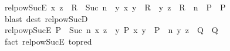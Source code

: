 \begin{isabellebody}
\endisatagproof
{\isafoldproof}%
%
\isadelimproof
\isanewline
%
\endisadelimproof
\isanewline
{}\isamarkupfalse%
\ relpow{\isacharunderscore}{\kern0pt}Suc{\isacharunderscore}{\kern0pt}E{}{\isacharcolon}{\kern0pt}\ {\isachardoublequoteopen}{\isacharparenleft}{\kern0pt}x{\isacharcomma}{\kern0pt}\ z{\isacharparenright}{\kern0pt}\ {\isasymin}\ R\ {\isacharcircum}{\kern0pt}{\isacharcircum}{\kern0pt}\ Suc\ n\ {\isasymLongrightarrow}\ {\isacharparenleft}{\kern0pt}{\isasymAnd}y{\isachardot}{\kern0pt}\ {\isacharparenleft}{\kern0pt}x{\isacharcomma}{\kern0pt}\ y{\isacharparenright}{\kern0pt}\ {\isasymin}\ R\ {\isasymLongrightarrow}\ {\isacharparenleft}{\kern0pt}y{\isacharcomma}{\kern0pt}\ z{\isacharparenright}{\kern0pt}\ {\isasymin}\ R\ {\isacharcircum}{\kern0pt}{\isacharcircum}{\kern0pt}\ n\ {\isasymLongrightarrow}\ P{\isacharparenright}{\kern0pt}\ {\isasymLongrightarrow}\ P{\isachardoublequoteclose}\isanewline
%
\isadelimproof
\ \ %
\endisadelimproof
%
\isatagproof
{}\isamarkupfalse%
\ {\isacharparenleft}{\kern0pt}blast\ dest{\isacharcolon}{\kern0pt}\ relpow{\isacharunderscore}{\kern0pt}Suc{\isacharunderscore}{\kern0pt}D{}{\isacharparenright}{\kern0pt}%
\endisatagproof
{\isafoldproof}%
%
\isadelimproof
\isanewline
%
\endisadelimproof
\isanewline
{}\isamarkupfalse%
\ relpowp{\isacharunderscore}{\kern0pt}Suc{\isacharunderscore}{\kern0pt}E{}{\isacharcolon}{\kern0pt}\ {\isachardoublequoteopen}{\isacharparenleft}{\kern0pt}P\ {\isacharcircum}{\kern0pt}{\isacharcircum}{\kern0pt}\ Suc\ n{\isacharparenright}{\kern0pt}\ x\ z\ {\isasymLongrightarrow}\ {\isacharparenleft}{\kern0pt}{\isasymAnd}y{\isachardot}{\kern0pt}\ P\ x\ y\ {\isasymLongrightarrow}\ {\isacharparenleft}{\kern0pt}P\ {\isacharcircum}{\kern0pt}{\isacharcircum}{\kern0pt}\ n{\isacharparenright}{\kern0pt}\ y\ z\ {\isasymLongrightarrow}\ Q{\isacharparenright}{\kern0pt}\ {\isasymLongrightarrow}\ Q{\isachardoublequoteclose}\isanewline
%
\isadelimproof
\ \ %
\endisadelimproof
%
\isatagproof
{}\isamarkupfalse%
\ {\isacharparenleft}{\kern0pt}fact\ relpow{\isacharunderscore}{\kern0pt}Suc{\isacharunderscore}{\kern0pt}E{}\ {\isacharbrackleft}{\kern0pt}to{\isacharunderscore}{\kern0pt}pred{\isacharbrackright}{\kern0pt}{\isacharparenright}{\kern0pt}%
\endisatagproof
{\isafoldproof}%
%
\isadelimproof
\isanewline
%
\endisadelimproof
\isanewline
{}\isamarkupfalse%

\end{isabellebody}
